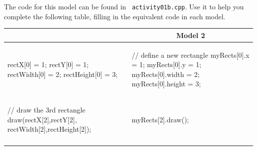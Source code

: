   \Q The code for this model can be found in {\tt
    activity01b.cpp}.  Use it to help you complete the 
    following table, filling in the equivalent code 
    in each model.
    \begin{center}
      \renewcommand{\arraystretch}{2}
      \begin{tabular}{|p{2.9in}|p{2.9in}|}
        \hline
        \rowcolor{orange!20}\multicolumn{1}{|c|}{\bf Model 1} & \multicolumn{1}{|c|}{\bf Model 2}\\
        \hline
        \begin{minipage}{2.9in}
          \begin{answer}[1.2in]
            \small
            \begin{cpplst}
rectX[0] = 1;
rectY[0] = 1;
rectWidth[0] = 2;
rectHeight[0] = 3;
            \end{cpplst}
          \end{answer}
        \end{minipage}
        &
        \begin{minipage}{2.9in}
          \small
          \begin{cpplst}
// define a new rectangle              
myRects[0].x = 1;
myRects[0].y = 1;
myRects[0].width = 2;
myRects[0].height = 3;
          \end{cpplst}
        \end{minipage}
        \\
        \hline
        \begin{minipage}{2.9in}
          \small
          \begin{cpplst}
// draw the 3rd rectangle
draw(rectX[2],rectY[2],
     rectWidth[2],rectHeight[2]);
          \end{cpplst}
        \end{minipage}
        &
        \begin{minipage}{2.9in}
          \begin{answer}[1in]
            \small
            \begin{cpplst}
myRects[2].draw();                
            \end{cpplst}
          \end{answer}
        \end{minipage}
        \\
        \hline
        \begin{minipage}{3in}
          \begin{answer}[1.2in]
            \small
            \begin{cpplst}

\end{cpplst}
\end{answer}
\end{minipage}
\end{tabular}
\end{center}
